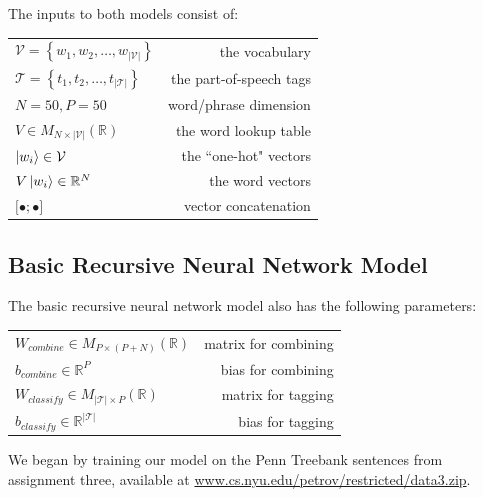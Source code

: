 \documentclass[11pt]{article}
\begin{document}
The inputs to both models consist of:

\begin{center}
\begin{tabular}{ l r }
  $\mathcal{V} = \left\{w_1,w_2,\ldots,w_{\left\vert\mathcal{V}\right\vert}\right\}$ & the vocabulary \\
  $\mathcal{T} = \left\{t_1,t_2,\ldots,t_{\left\vert\mathcal{T}\right\vert}\right\}$ & the part-of-speech tags \\
  $N = 50, P = 50$ & word/phrase dimension \\
  $V\in M_{N\times\left\vert\mathcal{V}\right\vert}(\mathbb{R})$ & the word lookup table \\
  $\Ket{w_i}\in\mathcal{V}$ & the ``one-hot" vectors \\
  $V\Ket{w_i}\in\mathbb{R}^N$ & the word vectors \\
  $\Big[\bullet;\bullet\Big]$ & vector concatenation \\
\end{tabular}
\end{center}
\vspace{5mm}

\subsection{Basic Recursive Neural Network Model}

The basic recursive neural network model also has the following parameters:

\begin{center}
\begin{tabular}{ l r }
  $W_{combine}\in M_{P\times(P+N)}(\mathbb{R})$ & matrix for combining \\
  $b_{combine}\in \mathbb{R}^P$ & bias for combining \\
  $W_{classify}\in M_{\left\vert\mathcal{T}\right\vert\times P}(\mathbb{R})$ & matrix for tagging \\
  $b_{classify}\in \mathbb{R}^{\left\vert\mathcal{T}\right\vert}$ & bias for tagging \\
\end{tabular}
\end{center}

\vspace{5mm}
We began by training our model on the Penn Treebank sentences from assignment three, available at \hyperlink{http://www.cs.nyu.edu/petrov/restricted/data3.zip}{www.cs.nyu.edu/petrov/restricted/data3.zip}.
\end{document}
